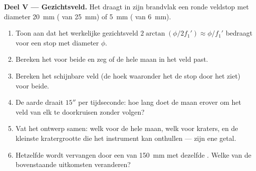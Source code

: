 \begin{problem}
\medskip
\noindent\textbf{Deel V --- Gezichtsveld.}
Het  draagt in zijn brandvlak een ronde veldstop met
diameter \qty{20}{mm} ( van \qty{25}{mm}) of \qty{5}{mm}
( van \qty{6}{mm}).
\begin{enumerate}[resume]
  \item Toon aan dat het werkelijke gezichtsveld $2\arctan(\phi/2f_1')
        \approx \phi/f_1'$ bedraagt voor een stop met diameter $\phi$.
  \item Bereken het voor beide  en zeg of de hele maan in het
        veld past.
  \item Bereken het schijnbare veld (de hoek waaronder het  de stop
        door het  ziet) voor beide.
  \item De aarde draait $15''$ per tijdseconde: hoe lang doet de
        maan erover om het veld van elk  te doorkruisen zonder volgen?
  \item Vat het ontwerp samen: welk  voor de hele maan, welk
        voor kraters, en de kleinste kratergrootte die het instrument kan
        onthullen --- zijn ene getal.
  \item Hetzelfde  wordt vervangen door een  van
        \qty{150}{mm} met dezelfde . Welke van de
        bovenstaande uitkomsten veranderen?
\end{enumerate}
\end{problem}
